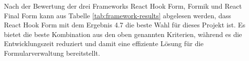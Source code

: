 Nach der Bewertung der drei Frameworks React Hook Form, Formik und React Final Form kann aus Tabelle \ref{tab:framework-results} abgelesen werden, dass React Hook Form mit dem Ergebnis 4.7 die beste Wahl für dieses Projekt ist. Es bietet die beste Kombination aus den oben genannten Kriterien, während es die Entwicklungszeit reduziert und damit eine effiziente Lösung für die Formularverwaltung bereitstellt. 
